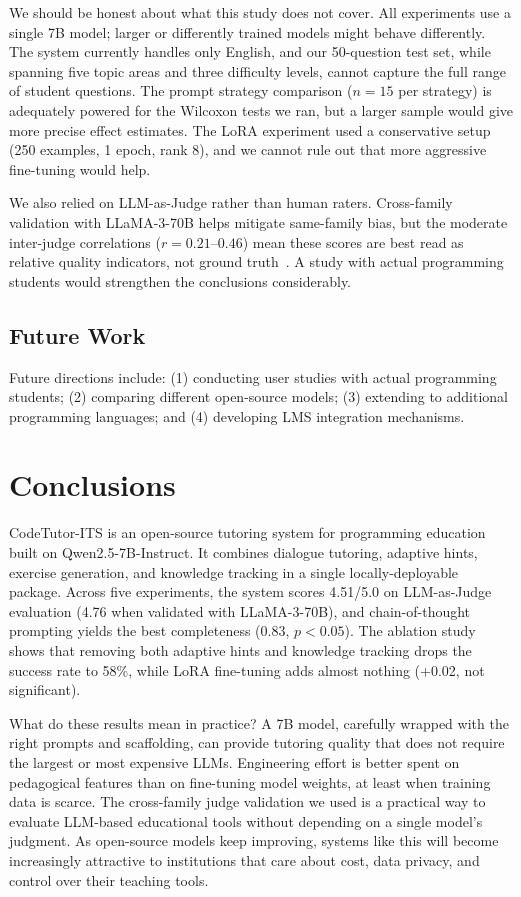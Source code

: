 \documentclass[journal,article,submit,pdftex,moreauthors]{Definitions/mdpi}
\begin{document}
We should be honest about what this study does not cover. All experiments use a single 7B model; larger or differently trained models might behave differently. The system currently handles only English, and our 50-question test set, while spanning five topic areas and three difficulty levels, cannot capture the full range of student questions. The prompt strategy comparison ($n = 15$ per strategy) is adequately powered for the Wilcoxon tests we ran, but a larger sample would give more precise effect estimates. The LoRA experiment used a conservative setup (250 examples, 1 epoch, rank 8), and we cannot rule out that more aggressive fine-tuning would help.

We also relied on LLM-as-Judge rather than human raters. Cross-family validation with LLaMA-3-70B helps mitigate same-family bias, but the moderate inter-judge correlations ($r = 0.21$--$0.46$) mean these scores are best read as relative quality indicators, not ground truth~\cite{ref32}. A study with actual programming students would strengthen the conclusions considerably.

\subsection{Future Work}

Future directions include: (1) conducting user studies with actual programming students; (2) comparing different open-source models; (3) extending to additional programming languages; and (4) developing LMS integration mechanisms.

\section{Conclusions}

CodeTutor-ITS is an open-source tutoring system for programming education built on Qwen2.5-7B-Instruct. It combines dialogue tutoring, adaptive hints, exercise generation, and knowledge tracking in a single locally-deployable package. Across five experiments, the system scores 4.51/5.0 on LLM-as-Judge evaluation (4.76 when validated with LLaMA-3-70B), and chain-of-thought prompting yields the best completeness (0.83, $p < 0.05$). The ablation study shows that removing both adaptive hints and knowledge tracking drops the success rate to 58\%, while LoRA fine-tuning adds almost nothing (+0.02, not significant).

What do these results mean in practice? A 7B model, carefully wrapped with the right prompts and scaffolding, can provide tutoring quality that does not require the largest or most expensive LLMs. Engineering effort is better spent on pedagogical features than on fine-tuning model weights, at least when training data is scarce. The cross-family judge validation we used is a practical way to evaluate LLM-based educational tools without depending on a single model's judgment. As open-source models keep improving, systems like this will become increasingly attractive to institutions that care about cost, data privacy, and control over their teaching tools.
\end{document}
